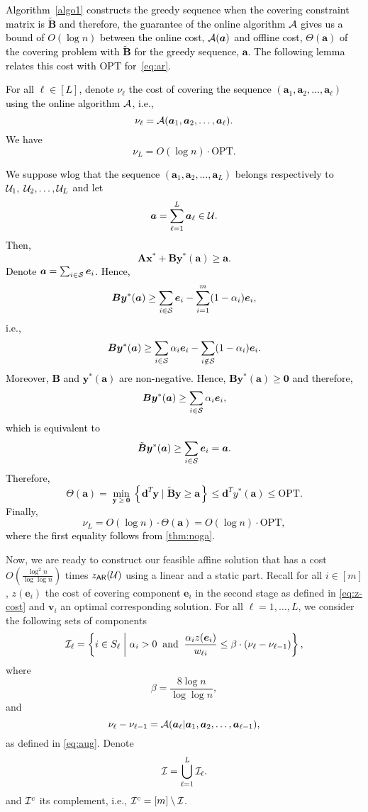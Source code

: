 \documentclass[moor]{informs1}              %
\newcommand{\opt}{\mathrm{OPT}}
\newcommand{\mb}[1]{\ensuremath{\boldsymbol{#1}}}
\newcommand*{\red}{\textcolor{black}}
\begin{document}
\red{
Algorithm~\ref{algo1} constructs the greedy sequence when the covering constraint matrix is $\mb{\tilde B}$ and therefore, the guarantee of the online algorithm ${\cal A}$ gives us a bound of $O(\log n)$ between the online cost, ${\cal A}(\mb a)$ and offline cost, $\Theta(\mb a)$ of the covering problem with $\tilde{\mb B}$ for the greedy sequence, $\mb a$. The following lemma relates this cost with {\sf OPT} for~\eqref{eq:ar}. 
\begin{lemma}\label{lem:lastone}
For all $ \ell \in [L]$, denote $\nu_{\ell}$ the cost of covering the sequence $(\mb a_1, \mb a_2, \ldots , \mb a_{\ell})$ using the online algorithm ${{\cal A}}$, i.e.,
$${\nu}_{\ell}= {\cal A}( \mb a_1, \mb a_2,\ldots, \mb a_{\ell}).$$ We have
$$ {\nu}_L = O(\log n) \cdot  \opt.$$
\end{lemma}
We suppose wlog that the sequence $(\mb a_1, \mb a_2, \ldots , \mb a_L)$ belongs respectively to  ${\cal U}_1,\; {\cal U}_2,\ldots,{\cal U}_L$ and let
$$ \mb a = \sum_{\ell=1}^L \mb a_{\ell} \in {\cal U}.$$
Then,
$$ \mb A \mb x^* + \mb B \mb y^*( \mb a) \geq \mb a.$$
Denote $\mb a = \sum_{i \in {\cal S}} \mb e_i $. Hence,
$$  \mb B \mb y^*( \mb a) \geq \sum_{i \in {\cal S}} \mb e_i     -  \sum_{i =1}^m  (1- \alpha_i) \mb e_i,        $$
i.e.,
$$  \mb B \mb y^*( \mb a) \geq \sum_{i \in {\cal S}}  \alpha_i \mb e_i     -  \sum_{i \notin {\cal S}}  (1- \alpha_i) \mb e_i.$$
Moreover, $\mb B$ and $ \mb y^*(\mb a)$ are non-negative. Hence, $\mb B \mb y^*( \mb a) \geq \mb 0$ and therefore,
$$  \mb B \mb y^*( \mb a) \geq \sum_{i \in {\cal S}}  \alpha_i \mb e_i,        $$
which is equivalent to
$$  \tilde{\mb B} \mb y^*( \mb a) \geq \sum_{i \in {\cal S}}   \mb e_i   = \mb a.$$
Therefore,
$$ \Theta(\mb a) =    \min_{\mb y \geq \mb 0} \left\{ \mb d^T \mb y \; \bigg\vert \; \mb{\tilde{B}} \mb y \geq \mb a \right\} \leq    \mb d^T y^*(\mb a)  \leq  \opt.$$
Finally,
$$ {\nu}_L = O(\log n) \cdot  {\Theta}(\mb a) = O(\log n) \cdot \opt,$$
where the first equality follows from \eqref{thm:noga}.
\hfill
\Halmos
\endproof
}


Now, we are ready to construct our feasible affine solution that has a cost  $O\left( \frac{\log^2 n}{\log \log n} \right)$ times $z_{\sf AR}( \cal U)$ using a linear and a static part.
Recall for all $i \in [m]$, $z( \mb e_i)$ the cost of covering component $\mb e_i$ in the second stage  as defined in \eqref{eq:z-cost} and $ {\mb v}_i $ an optimal corresponding solution. For all $\ell =1, \ldots,L$,  we consider the following sets of components
\red{$$ {\cal I}_{\ell}= \left\{ i \in S_{\ell} \; \bigg\vert  \;  \alpha_i >0 \; \; \text{and} \; \; \frac{\alpha_i z(\mb e_i)}{w_{\ell i}}  \leq \beta \cdot ({\nu}_{\ell}-{\nu}_{\ell-1} )\right\},$$}
where $$\beta=   \frac{8 \log n}{\log \log n}, $$ and $${\nu}_{\ell}-{\nu}_{\ell-1}= {\cal A} (  \mb a_{\ell} \vert \mb a_1, \mb a_2,\ldots, \mb a_{\ell-1}),$$ as defined in \eqref{eq:aug}. Denote
$${\cal I}= \bigcup_{\ell=1}^L {\cal I}_{\ell}.$$
and ${\cal I}^c$ its complement, i.e., ${\cal I}^c= [m] \setminus  {\cal I}$.
\end{document}
